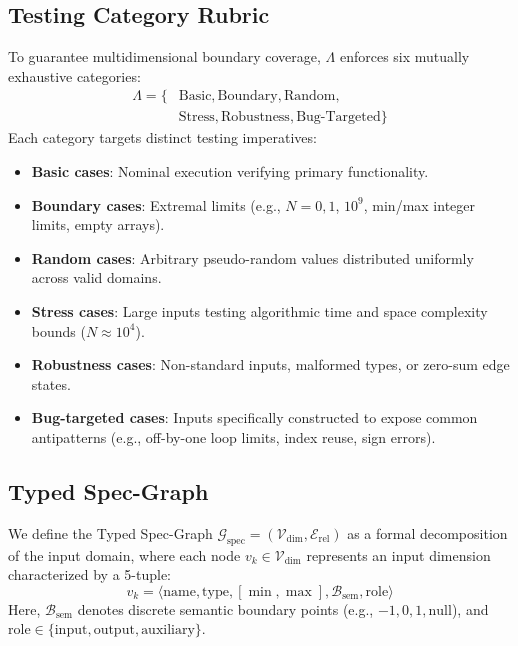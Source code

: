 \documentclass[conference]{IEEEtran}
\begin{document}
\subsection{Testing Category Rubric}
To guarantee multidimensional boundary coverage, $\Lambda$ enforces six mutually exhaustive categories:
\begin{equation}
\begin{split}
    \Lambda = \{&\text{Basic}, \text{Boundary}, \text{Random}, \\
                &\text{Stress}, \text{Robustness}, \text{Bug-Targeted}\}
\end{split}
\end{equation}
Each category targets distinct testing imperatives:
\begin{itemize}
    \item \textbf{Basic cases}: Nominal execution verifying primary functionality.
    \item \textbf{Boundary cases}: Extremal limits (e.g., $N=0, 1$, $10^9$, min/max integer limits, empty arrays).
    \item \textbf{Random cases}: Arbitrary pseudo-random values distributed uniformly across valid domains.
    \item \textbf{Stress cases}: Large inputs testing algorithmic time and space complexity bounds ($N \approx 10^4$).
    \item \textbf{Robustness cases}: Non-standard inputs, malformed types, or zero-sum edge states.
    \item \textbf{Bug-targeted cases}: Inputs specifically constructed to expose common antipatterns (e.g., off-by-one loop limits, index reuse, sign errors).
\end{itemize}

\subsection{Typed Spec-Graph}
We define the Typed Spec-Graph $\mathcal{G}_{\text{spec}} = (\mathcal{V}_{\text{dim}}, \mathcal{E}_{\text{rel}})$ as a formal decomposition of the input domain, where each node $v_k \in \mathcal{V}_{\text{dim}}$ represents an input dimension characterized by a 5-tuple:
\begin{equation}
    v_k = \langle \text{name}, \text{type}, [\min, \max], \mathcal{B}_{\text{sem}}, \text{role} \rangle
\end{equation}
Here, $\mathcal{B}_{\text{sem}}$ denotes discrete semantic boundary points (e.g., $-1, 0, 1, \text{null}$), and $\text{role} \in \{\text{input}, \text{output}, \text{auxiliary}\}$.
\end{document}
